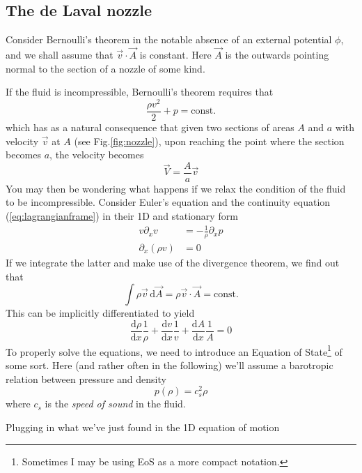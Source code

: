 \subsection{The de Laval nozzle}
Consider Bernoulli's theorem in the notable absence of an external potential $\phi$, and we shall assume that $\vec{v}\cdot\vec{A}$ is constant. Here $\vec{A}$ is the outwards pointing normal to the section of a nozzle of some kind.

\par If the fluid is incompressible, Bernoulli's theorem requires that 
\begin{equation*}
    \frac{\rho v^{2}}{2} + p = \text{const.}
\end{equation*}
which has as a natural consequence that given two sections of areas $A$ and $a$ with velocity $\vec{v}$ at $A$ (see Fig.\ref{fig:nozzle}), upon reaching the point where the section becomes $a$, the velocity becomes 
\begin{equation*}
    \vec{V} = \frac{A}{a}\vec{v}
\end{equation*}
You may then be wondering what happens if we relax the condition of the fluid to be incompressible. Consider Euler's equation and the continuity equation (\ref{eq:lagrangianframe}) in their 1D and stationary form 
\begin{align}
    v\partial_{x}v &= -\frac{1}{\rho}\partial_{x}p\\
    \partial_{x}(\rho v) &= 0
\end{align}
If we integrate the latter and make use of the divergence theorem, we find out that 
\begin{equation*}
    \int \rho \vec{v}\,\text{d}\vec{A} = \rho\vec{v}\cdot\vec{A} = \text{const.}
\end{equation*}
This can be implicitly differentiated to yield 
\begin{equation*}
    \frac{\text{d}\rho}{\text{d}x}\frac{1}{\rho}+\frac{\text{d}v}{\text{d}x}\frac{1}{v}+\frac{\text{d}A}{\text{d}x}\frac{1}{A} = 0
\end{equation*}
To properly solve the equations, we need to introduce an Equation of State\footnote{Sometimes I may be using EoS as a more compact notation.} of some sort. Here (and rather often in the following) we'll assume a barotropic relation between pressure and density 
\begin{equation}
    p(\rho) = c_{s}^{2}\rho
    \label{eq:barotropic}
\end{equation}
where $c_{s}$ is the \emph{speed of sound} in the fluid.
\par Plugging in what we've just found in the 1D equation of motion

